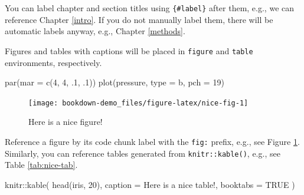 \documentclass[
]{book}
\newenvironment{Shaded}{\begin{snugshade}}{\end{snugshade}}
\newcommand{\AttributeTok}[1]{\textcolor[rgb]{0.77,0.63,0.00}{#1}}
\newcommand{\ConstantTok}[1]{\textcolor[rgb]{0.00,0.00,0.00}{#1}}
\newcommand{\DecValTok}[1]{\textcolor[rgb]{0.00,0.00,0.81}{#1}}
\newcommand{\FunctionTok}[1]{\textcolor[rgb]{0.00,0.00,0.00}{#1}}
\newcommand{\NormalTok}[1]{#1}
\newcommand{\SpecialCharTok}[1]{\textcolor[rgb]{0.00,0.00,0.00}{#1}}
\newcommand{\StringTok}[1]{\textcolor[rgb]{0.31,0.60,0.02}{#1}}
\begin{document}
You can label chapter and section titles using \texttt{\{\#label\}} after them, e.g., we can reference Chapter \ref{intro}. If you do not manually label them, there will be automatic labels anyway, e.g., Chapter \ref{methods}.

Figures and tables with captions will be placed in \texttt{figure} and \texttt{table} environments, respectively.

\begin{Shaded}
\begin{Highlighting}[]
\FunctionTok{par}\NormalTok{(}\AttributeTok{mar =} \FunctionTok{c}\NormalTok{(}\DecValTok{4}\NormalTok{, }\DecValTok{4}\NormalTok{, .}\DecValTok{1}\NormalTok{, .}\DecValTok{1}\NormalTok{))}
\FunctionTok{plot}\NormalTok{(pressure, }\AttributeTok{type =} \StringTok{\textquotesingle{}b\textquotesingle{}}\NormalTok{, }\AttributeTok{pch =} \DecValTok{19}\NormalTok{)}
\end{Highlighting}
\end{Shaded}

\begin{figure}

{\centering \texttt{[image: bookdown-demo\_files/figure-latex/nice-fig-1]} 

}

\caption{Here is a nice figure!}\label{fig:nice-fig}
\end{figure}

Reference a figure by its code chunk label with the \texttt{fig:} prefix, e.g., see Figure \ref{fig:nice-fig}. Similarly, you can reference tables generated from \texttt{knitr::kable()}, e.g., see Table \ref{tab:nice-tab}.

\begin{Shaded}
\begin{Highlighting}[]
\NormalTok{knitr}\SpecialCharTok{::}\FunctionTok{kable}\NormalTok{(}
  \FunctionTok{head}\NormalTok{(iris, }\DecValTok{20}\NormalTok{), }\AttributeTok{caption =} \StringTok{\textquotesingle{}Here is a nice table!\textquotesingle{}}\NormalTok{,}
  \AttributeTok{booktabs =} \ConstantTok{TRUE}
\NormalTok{)}
\end{Highlighting}
\end{Shaded}
\end{document}

